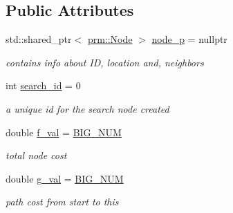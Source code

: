 \subsection*{Public Attributes}
\begin{DoxyCompactItemize}
\item 
\mbox{\label{structhsearch_1_1SearchNode_a891ec15f4f07e474fda39978a6ca6902}} 
std\+::shared\+\_\+ptr$<$ \hyperlink{structprm_1_1Node}{prm\+::\+Node} $>$ \hyperlink{structhsearch_1_1SearchNode_a891ec15f4f07e474fda39978a6ca6902}{node\+\_\+p} = nullptr
\begin{DoxyCompactList}\small\item\em contains info about ID, location and, neighbors \end{DoxyCompactList}\item 
\mbox{\label{structhsearch_1_1SearchNode_ab0e32e34e1e2682c0cc7968df6dd7b85}} 
int \hyperlink{structhsearch_1_1SearchNode_ab0e32e34e1e2682c0cc7968df6dd7b85}{search\+\_\+id} = 0
\begin{DoxyCompactList}\small\item\em a unique id for the search node created \end{DoxyCompactList}\item 
\mbox{\label{structhsearch_1_1SearchNode_a0f9510192452ac5efd6733eadfee38c2}} 
double \hyperlink{structhsearch_1_1SearchNode_a0f9510192452ac5efd6733eadfee38c2}{f\+\_\+val} = \hyperlink{potential__fields_8hpp_a44b8ad40964aabfb40ae3a0625190475}{B\+I\+G\+\_\+\+N\+UM}
\begin{DoxyCompactList}\small\item\em total node cost \end{DoxyCompactList}\item 
\mbox{\label{structhsearch_1_1SearchNode_afc0b32b3c3c748e6585b76fc53553063}} 
double \hyperlink{structhsearch_1_1SearchNode_afc0b32b3c3c748e6585b76fc53553063}{g\+\_\+val} = \hyperlink{potential__fields_8hpp_a44b8ad40964aabfb40ae3a0625190475}{B\+I\+G\+\_\+\+N\+UM}
\begin{DoxyCompactList}\small\item\em path cost from start to this \end{DoxyCompactList}\item 
\mbox{\label{structhsearch_1_1SearchNode_a8e25282237951762ced727eb0097abd9}} 

\end{DoxyCompactItemize}
